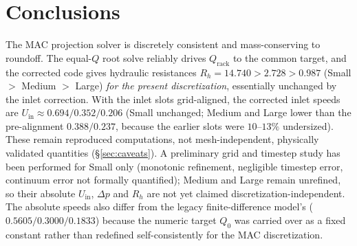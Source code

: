 \documentclass[11pt]{article}
\begin{document}
\section{Conclusions}
The MAC projection solver is discretely consistent and mass-conserving to
roundoff. The equal-$Q$ root solve reliably drives $Q_\mathrm{rack}$ to the
common target, and the corrected code gives hydraulic resistances
$R_h = 14.740 > 2.728 > 0.987$ (Small $>$ Medium $>$ Large) \emph{for the
present discretization}, essentially unchanged by the inlet correction. With the
inlet slots grid-aligned, the corrected inlet speeds are
$U_\mathrm{in}\approx 0.694/0.352/0.206$ (Small unchanged; Medium and Large lower
than the pre-alignment $0.388/0.237$, because the earlier slots were $10$--$13\%$
undersized). These remain reproduced computations, not mesh-independent,
physically validated quantities (\S\ref{sec:caveats}). A preliminary grid and
timestep study has been performed for Small only (monotonic refinement, negligible
timestep error, continuum error not formally quantified); Medium and Large remain
unrefined, so their absolute $U_\mathrm{in}$, $\Delta p$ and $R_h$ are not yet
claimed discretization-independent. The absolute speeds also
differ from the legacy finite-difference model's ($0.5605/0.3000/0.1833$)
because the numeric target $Q_0$ was carried over as a fixed constant rather than
redefined self-consistently for the MAC discretization.
\end{document}
